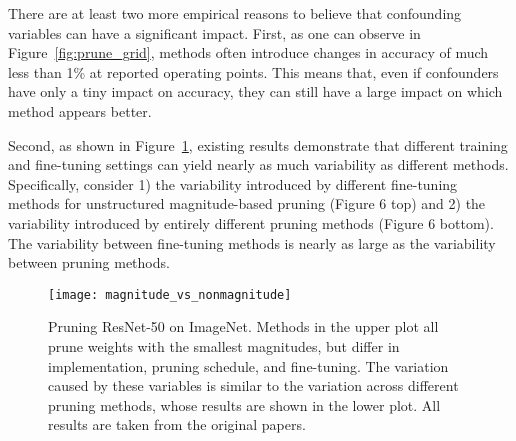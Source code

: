 \vspace{2mm}
There are at least two more empirical reasons to believe that confounding variables can have a significant impact. First, as one can observe in Figure~\ref{fig:prune_grid}, methods often introduce changes in accuracy of much less than 1\% at reported operating points. This means that, even if confounders have only a tiny impact on accuracy, they can still have a large impact on which method appears better. %

\vspace{2mm}
Second, as shown in Figure~\ref{fig:magnitude_vs_nonmagnitude}, existing results demonstrate that different training and fine-tuning settings can yield nearly as much variability as different methods. Specifically, consider 1) the variability introduced by different fine-tuning methods for unstructured magnitude-based pruning (Figure 6 top) and 2) the variability introduced by entirely different pruning methods (Figure 6 bottom). The variability between fine-tuning methods is nearly as large as the variability between pruning methods.
\begin{figure}[h]
\begin{center}
\texttt{[image: magnitude\_vs\_nonmagnitude]}
\caption{Pruning ResNet-50 on ImageNet. Methods in the upper plot all prune weights with the smallest magnitudes, but differ in implementation, pruning schedule, and fine-tuning. The variation caused by these variables is similar to the variation across different pruning methods, whose results are shown in the lower plot. All results are taken from the original papers.}
\label{fig:magnitude_vs_nonmagnitude}
\end{center}
\vspace*{3mm}
\end{figure}
